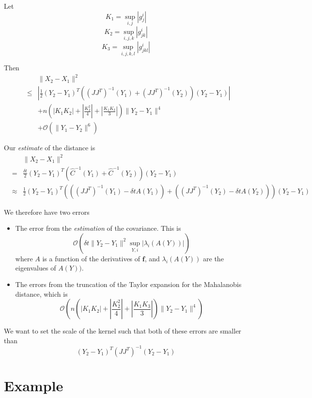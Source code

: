 \documentclass[12pt]{article}
\begin{document}
Let 
$$K_1 = \sup_{i,j} |g_j^i|$$
$$K_2 = \sup_{i,j,k} |g_{jk}^i|$$
$$K_3 = \sup_{i,j,k,l} |g_{jkl}^i|$$

Then
\begin{eqnarray}
&&\| X_2 - X_1 \|^2 \\
&\le&  \left| \frac{1}{2} (Y_2 - Y_1 )^T ((J J^T)^{-1} (Y_1) + (J J^T)^{-1}(Y_2)) (Y_2 - Y_1 ) \right| \\
&& + n \left( \left| K_1 K_2 \right| + \left| \frac{ K_2^2}{4} \right|  + \left| \frac{K_1 K_3}{3} \right|  \right) \| Y_2 - Y_1 \| ^4  \\
&& + \mathcal{O} (\|Y_1 - Y_2 \|^6 ) 
\end{eqnarray}

Our {\em estimate} of the distance is 
\begin{eqnarray}
&&\| X_2 - X_1 \|^2 \\
&=& \frac{\delta t}{2} (Y_2 - Y_1)^T (\hat{C}^{-1} (Y_1) + \hat{C}^{-1}(Y_2)) (Y_2 - Y_1)\\
&\approx & \frac{1}{2} (Y_2 - Y_1)^T \left( \left( (J J^T)^{-1}(Y_1)- \delta t A(Y_1) \right)  + \left((J J^T)^{-1}(Y_2)- \delta t A(Y_2) \right) \right) (Y_2 - Y_1)
\end{eqnarray}

We therefore have two errors
\begin{itemize}
\item The error from the {\em estimation} of the covariance.
%
This is
$$\mathcal{O} \left( \delta t \| Y_2 - Y_1 \|^2 \sup_{Y, i} |\lambda_i(A(Y))| \right)$$
%
where $A$ is a function of the derivatives of $\mathbf{f}$, and $\lambda_i(A(Y))$ are the eigenvalues of $A(Y))$.

\item The errors from the truncation of the Taylor expansion for the Mahalanobis distance, which is 
$$\mathcal{O} \left(  n \left( \left| K_1 K_2 \right| + \left| \frac{ K_2^2}{4} \right|  + \left| \frac{K_1 K_3}{3} \right|  \right) \| Y_2 - Y_1 \| ^4  \right)$$
\end{itemize}

We want to set the scale of the kernel such that both of these errors are smaller than 
\begin{equation}
(Y_2 - Y_1)^T (JJ^T)^{-1} (Y_2 - Y_1) 
\end{equation}

\section{Example}
\end{document}
